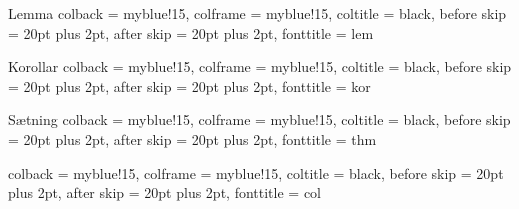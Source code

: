 {Lemma}
{
colback		= myblue!15,
colframe	= myblue!15,
coltitle	= black,
before skip	= 20pt plus 2pt,
after skip	= 20pt plus 2pt,
fonttitle	= \bfseries
}
{lem}


{Korollar}
{
colback		= myblue!15,
colframe	= myblue!15,
coltitle	= black,
before skip	= 20pt plus 2pt,
after skip	= 20pt plus 2pt,
fonttitle	= \bfseries
}
{kor}

{Sætning}
{
colback		= myblue!15,
colframe	= myblue!15,
coltitle	= black,
before skip	= 20pt plus 2pt,
after skip	= 20pt plus 2pt,
fonttitle	= \bfseries
}
{thm}

{}
{
colback		= myblue!15,
colframe	= myblue!15,
coltitle	= black,
before skip	= 20pt plus 2pt,
after skip	= 20pt plus 2pt,
fonttitle	= \bfseries
}
{col}


\newcommand{\imgfig}[3][0.75]{
  \begin{figure}[htbp]
    \centering
    \texttt{[image: fig/img/\#2]}
    \caption{#3}
    \label{fig:#2}
  \end{figure}
}

\newcommand{\dimgfig}[5][0.5]{
  \ifx\dimgleftwidth\undefined
    \newlength{\dimgleftwidth}
    \newlength{\dimgrightwidth}
  \fi
  \setlength{\dimgleftwidth}{#1\textwidth-0.02\textwidth}
  \setlength{\dimgrightwidth}{0.96\textwidth-\dimgleftwidth}
  \begin{figure}[htbp]
    \centering
    \begin{minipage}[t]{\dimgleftwidth}
      \centering
      \texttt{[image: fig/img/\#2]}
      \caption{#3}
      \label{fig:#2}
    \end{minipage}
    \hfill
    \begin{minipage}[t]{\dimgrightwidth}
      \centering
      \texttt{[image: fig/img/\#4]}
      \caption{#5}
      \label{fig:#4}
    \end{minipage}
  \end{figure}
}
